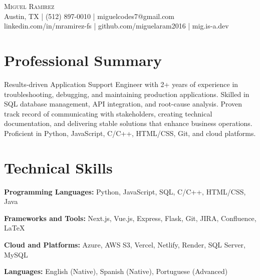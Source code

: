 \documentclass[letterpaper,10pt]{article}
\begin{document}
\begin{center}
  {\Large \scshape Miguel Ramirez} \\ \vspace{0pt}
  Austin, TX | (512) 897-0010 | miguelcodes7@gmail.com \\ 
  linkedin.com/in/mramirez-fs | github.com/miguelaram2016 | mig.is-a.dev
\end{center}

\section*{Professional Summary}
\begin{compactitem}
  \item[]
    Results-driven Application Support Engineer with 2+ years of experience in troubleshooting, debugging, and maintaining production applications. Skilled in SQL database management, API integration, and root-cause analysis. Proven track record of communicating with stakeholders, creating technical documentation, and delivering stable solutions that enhance business operations. Proficient in Python, JavaScript, C/C++, HTML/CSS, Git, and cloud platforms.
\end{compactitem}

\section*{Technical Skills}
\begin{compactitem}
  \item[]
    \textbf{Programming Languages:} Python, JavaScript, SQL, C/C++, HTML/CSS, Java
  \item[]
    \textbf{Frameworks and Tools:} Next.js, Vue.js, Express, Flask, Git, JIRA, Confluence, LaTeX
  \item[]
    \textbf{Cloud and Platforms:} Azure, AWS S3, Vercel, Netlify, Render, SQL Server, MySQL
  \item[]
    \textbf{Languages:} English (Native), Spanish (Native), Portuguese (Advanced)
\end{compactitem}

\end{document}
